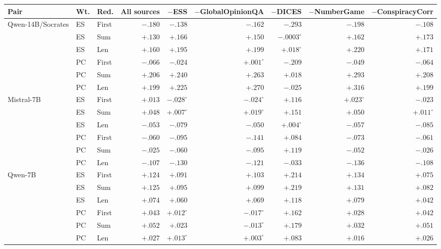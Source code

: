\begin{table}[t]
\centering\scriptsize
\setlength{\tabcolsep}{4pt}
\begin{tabular}{@{}lllrrrrrr@{}}
\toprule
Pair & Wt. & Red. & All sources & $-$ESS & $-$GlobalOpinionQA & $-$DICES & $-$NumberGame & $-$ConspiracyCorr \\
\midrule
Qwen-14B/Socrates & ES & First & $-.180$ & $-.138$ & $-.162$ & $-.293$ & $-.198$ & $-.108$ \\
 & ES & Sum & $+.130$ & $+.166$ & $+.150$ & $-.0003^{\circ}$ & $+.162$ & $+.173$ \\
 & ES & Len & $+.160$ & $+.195$ & $+.199$ & $+.018^{\circ}$ & $+.220$ & $+.171$ \\
 & PC & First & $-.066$ & $-.024$ & $+.001^{\circ}$ & $-.209$ & $-.049$ & $-.064$ \\
 & PC & Sum & $+.206$ & $+.240$ & $+.263$ & $+.018$ & $+.293$ & $+.208$ \\
 & PC & Len & $+.199$ & $+.225$ & $+.270$ & $-.025$ & $+.316$ & $+.199$ \\
\addlinespace[2pt]
Mistral-7B & ES & First & $+.013$ & $-.028^{\circ}$ & $-.024^{\circ}$ & $+.116$ & $+.023^{\circ}$ & $-.023$ \\
 & ES & Sum & $+.048$ & $+.007^{\circ}$ & $+.019^{\circ}$ & $+.151$ & $+.050$ & $+.011^{\circ}$ \\
 & ES & Len & $-.053$ & $-.079$ & $-.050$ & $+.004^{\circ}$ & $-.057$ & $-.085$ \\
 & PC & First & $-.060$ & $-.095$ & $-.141$ & $+.084$ & $-.073$ & $-.061$ \\
 & PC & Sum & $-.025$ & $-.060$ & $-.095$ & $+.119$ & $-.052$ & $-.026$ \\
 & PC & Len & $-.107$ & $-.130$ & $-.121$ & $-.033$ & $-.136$ & $-.108$ \\
\addlinespace[2pt]
Qwen-7B & ES & First & $+.124$ & $+.091$ & $+.103$ & $+.214$ & $+.134$ & $+.075$ \\
 & ES & Sum & $+.125$ & $+.095$ & $+.099$ & $+.219$ & $+.131$ & $+.082$ \\
 & ES & Len & $+.074$ & $+.060$ & $+.069$ & $+.118$ & $+.079$ & $+.042$ \\
 & PC & First & $+.043$ & $+.012^{\circ}$ & $-.017^{\circ}$ & $+.162$ & $+.028$ & $+.042$ \\
 & PC & Sum & $+.052$ & $+.023$ & $-.013^{\circ}$ & $+.179$ & $+.032$ & $+.051$ \\
 & PC & Len & $+.027$ & $+.013^{\circ}$ & $+.003^{\circ}$ & $+.083$ & $+.016$ & $+.026$ \\

\end{tabular}
\end{table}
